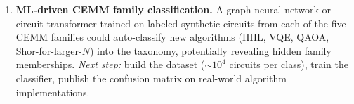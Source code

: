\begin{enumerate}
    \item \textbf{ML-driven CEMM family classification.} A graph-neural
          network or circuit-transformer trained on labeled synthetic
          circuits from each of the five CEMM families could auto-classify
          new algorithms (HHL, VQE, QAOA, Shor-for-larger-$N$) into the
          taxonomy, potentially revealing hidden family memberships.
          \emph{Next step:} build the dataset ($\sim 10^{4}$ circuits per
          class), train the classifier, publish the confusion matrix on
          real-world algorithm implementations.
\end{enumerate}
